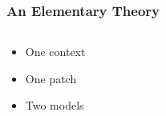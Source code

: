 \begin{frame}[fragile]
\frametitle{An Elementary Theory}
\begin{columns}
\begin{column}{.5\textwidth}
\begin{itemize}
  \item One context
  \item One patch
  \item Two models
\end{itemize}
\begin{code}%
\>[0]\AgdaSpace{}%
\AgdaSpace{}%
\AgdaSymbol{:}\AgdaSpace{}%
\AgdaSpace{}%
\<%
\\
\>[0][@{}l@{\AgdaIndent{0}}]%
\>[2]\AgdaSpace{}%
\AgdaSymbol{:}\AgdaSpace{}%
\<%
\\
%
\>[2]\AgdaSpace{}%
\AgdaSymbol{:}\AgdaSpace{}%
\AgdaSpace{}%
\AgdaSpace{}%
\<%
\end{code}
\end{column}
\begin{column}{.5\textwidth}
\begin{code}%
\>[0]\AgdaSpace{}%
\AgdaSymbol{:}\AgdaSpace{}%
\AgdaSpace{}%
\AgdaSpace{}%
\<%
\\
\>[0]\AgdaSpace{}%
\AgdaSpace{}%
\AgdaSymbol{=}\AgdaSpace{}%
\<%
\\
\>[0]\AgdaSpace{}%
\AgdaSymbol{(}\AgdaSpace{}%
\AgdaSymbol{)}\AgdaSpace{}%
\AgdaSymbol{=}\AgdaSpace{}%
\AgdaSpace{}%
\<%
\\
%
\\[\AgdaEmptyExtraSkip]%
\>[0]\AgdaSpace{}%
\AgdaSymbol{:}\AgdaSpace{}%
\AgdaSpace{}%
\AgdaSpace{}%
\<%
\\
\>[0]\AgdaSpace{}%
\AgdaSpace{}%
\AgdaSymbol{=}\AgdaSpace{}%
\<%
\\
\>[0]\AgdaSpace{}%
\AgdaSymbol{(}\AgdaSpace{}%
\AgdaSymbol{)}\AgdaSpace{}%
\AgdaSymbol{=}\AgdaSpace{}%
\AgdaSpace{}%
\<%
\end{code}
\end{column}
\end{columns}
\end{frame}

